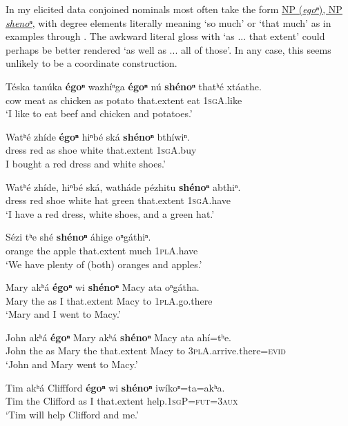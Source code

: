 \documentclass[output=paper]{LSP/langsci}
\begin{document}
In my elicited data conjoined nominals most often take the form \underline{NP (\textit{egoⁿ}), NP} \underline{\textit{shenoⁿ}}, with degree elements literally meaning `so much' or `that much' as in examples  through . The awkward literal gloss with `as ... that extent' could perhaps be better rendered `as well as ... all of those'. In any case, this seems unlikely to be a coordinate construction.

\begin{exe}
\ex\label{ex:rudin:18}
\gll Téska 	tanúka 	\textbf{égoⁿ} 	wazhíⁿga 	\textbf{égoⁿ}	nú \textbf{shénoⁿ} thatʰé  xtáathe.\\
	cow   	meat    	as     	chicken   	as     	potato 	that.extent 	eat      	\textsc{1sgA}.like\\
\trans `I like to eat beef and chicken and potatoes.'    
 
 \ex\label{ex:rudin:19}
\gll Watʰé 	zhíde 	\textbf{égoⁿ} 	hiⁿbé 	ská    \textbf{	shénoⁿ}  	bthíwiⁿ.\\
	dress   	red  	as   	shoe 	white 	that.extent 	\textsc{1sgA}.buy\\
\trans I bought a red dress and white shoes.'  

\ex\label{ex:rudin:20}
\gll Watʰé  zhíde,  hiⁿbé	ská,  watháde  pézhitu \textbf{shénoⁿ} abthiⁿ.\\ 
dress   	red   	shoe 	white 	hat  	green 	that.extent 	\textsc{1sgA}.have \\
\trans `I have a red dress, white shoes, and a green hat.'   

\ex\label{ex:rudin:21}
\gll Sézi  	tʰe 	shé  	\textbf{shénoⁿ} 	áhige 	oⁿgáthiⁿ. \\
	orange 	the 	apple 	that.extent 	much  	\textsc{1plA}.have \\
\trans `We have plenty of (both) oranges and apples.'

\ex\label{ex:rudin:22}
\gll Mary akʰá  	\textbf{égoⁿ} wi \textbf{shénoⁿ} Macy ata oⁿgátha. \\
 Mary	the  as  	I 	that.extent  	Macy to 	\textsc{1plA}.go.there \\
\trans `Mary and I went to Macy.'

\ex\label{ex:rudin:23}
\gll John akʰá \textbf{égoⁿ} Mary akʰá \textbf{shénoⁿ} Macy ata ahí=tʰe. \\
 John the 	as  Mary the 	that.extent  Macy to \textsc{3plA}.arrive.there=\textsc{evid} \\
\trans `John and Mary went to Macy.'
 
\ex\label{ex:rudin:24} 
\gll Tim akʰá Cliffford \textbf{égoⁿ} wi \textbf{shénoⁿ} iwíkoⁿ=ta=akʰa. \\
Tim the Clifford as 	I  that.extent  help.\textsc{1sgP}=\textsc{fut=3aux} \\
\trans `Tim will help Clifford and me.'
\end{exe}
\end{document}
